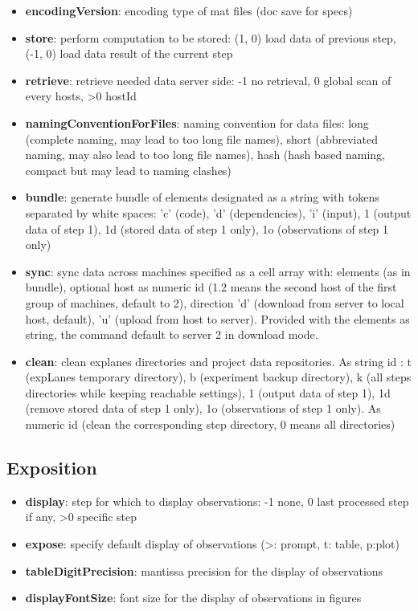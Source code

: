 \documentclass[a4paper,fleqn]{tufte-handout}
\begin{document}
\begin{itemize}
\item \textbf{encodingVersion}: encoding type of mat files (doc save for specs)
\item \textbf{store}: perform computation to be stored: (1, 0) load data of previous step, (-1, 0) load data result of the current step
\item \textbf{retrieve}: retrieve needed data server side: -1 no retrieval, 0 global scan of every hosts, >0 hostId
\item \textbf{namingConventionForFiles}: naming convention for data files: long (complete naming, may lead to too long file names), short (abbreviated naming, may also lead to too long file names), hash (hash based naming, compact but may lead to naming clashes)
\item \textbf{bundle}: generate bundle of elements designated as a string with tokens separated by white spaces: 'c' (code), 'd' (dependencies), 'i' (input), 1 (output data of step 1), 1d (stored data of step 1 only), 1o (observations of step 1 only) 
\item \textbf{sync}: sync data across machines specified as a cell array with: elements (as in bundle), optional host as numeric id (1.2 means the second host of the first group of machines, default to 2), direction 'd' (download from server to local host, default), 'u' (upload from host to server). Provided with the elements as string, the command default to server 2 in download mode.
\item \textbf{clean}: clean explanes directories and project data repositories. As string id : t (expLanes temporary directory), b (experiment backup directory), k (all steps directories while keeping reachable settings), 1 (output data of step 1), 1d (remove stored data of step 1 only), 1o (observations of step 1 only). As numeric id (clean the corresponding step directory, 0 means all directories) 
\end{itemize}

\subsection{Exposition}

\begin{itemize}
\item \textbf{display}: step for which to display observations: -1 none, 0 last processed step if any, >0 specific step
\item \textbf{expose}: specify default display of observations (>: prompt, t: table, p:plot)
\item \textbf{tableDigitPrecision}: mantissa precision for the display of observations
\item \textbf{displayFontSize}: font size for the display of observations in figures
\end{itemize}
\end{document}
